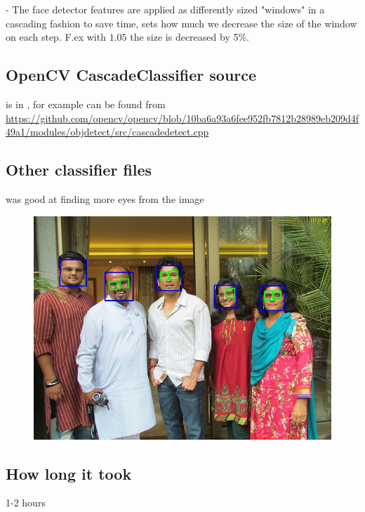 \documentclass{article}
\begin{document}
     - The face detector features are applied as differently sized "windows" in a cascading fashion to save time,  sets how much we decrease the size of the window on each step. F.ex with $1.05$ the size is decreased by 5\%.

\subsection{OpenCV CascadeClassifier source}
is in , for example can be found from \url{https://github.com/opencv/opencv/blob/10ba6a93a6fee952fb7812b28989eb209d4f49a1/modules/objdetect/src/cascadedetect.cpp}

\subsection{Other classifier files}
     was good at finding more eyes from the image

    \begin{figure}[h]
        \centering
        \includegraphics[scale=0.45]{eyeglasses_detect}
    \end{figure}


\subsection{How long it took}
1-2 hours
\end{document}
